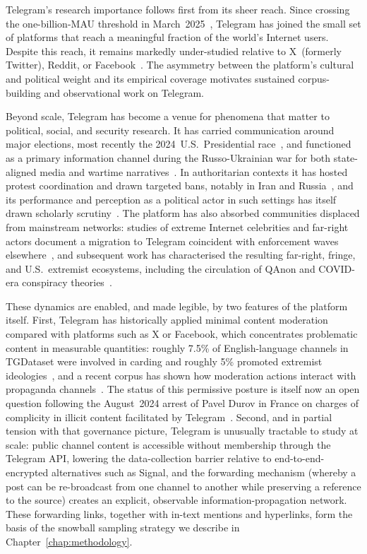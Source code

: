 Telegram's research importance follows first from its sheer reach.
Since crossing the one-billion-MAU threshold in March~2025~\cite{telegramstats2025}, Telegram has joined the small set of platforms that reach a meaningful fraction of the world's Internet users.
Despite this reach, it remains markedly under-studied relative to X~(formerly Twitter), Reddit, or Facebook~\cite{propaganda2025}.
The asymmetry between the platform's cultural and political weight and its empirical coverage motivates sustained corpus-building and observational work on Telegram.

Beyond scale, Telegram has become a venue for phenomena that matter to political, social, and security research.
It has carried communication around major elections, most recently the 2024~U.S.\ Presidential race~\cite{blas2025}, and functioned as a primary information channel during the Russo-Ukrainian war for both state-aligned media and wartime narratives~\cite{hanley2024,kloo2024}.
In authoritarian contexts it has hosted protest coordination and drawn targeted bans, notably in Iran and Russia~\cite{akbari2019}, and its performance and perception as a political actor in such settings has itself drawn scholarly scrutiny~\cite{wijermars2022}.
The platform has also absorbed communities displaced from mainstream networks: studies of extreme Internet celebrities and far-right actors document a migration to Telegram coincident with enforcement waves elsewhere~\cite{rogers2020,urman2022}, and subsequent work has characterised the resulting far-right, fringe, and U.S.\ extremist ecosystems, including the circulation of QAnon and COVID-era conspiracy theories~\cite{bovet2022,hoseini2024,walther2021}.

These dynamics are enabled, and made legible, by two features of the platform itself.
First, Telegram has historically applied minimal content moderation compared with platforms such as X or Facebook, which concentrates problematic content in measurable quantities: roughly 7.5\% of English-language channels in TGDataset were involved in carding and roughly 5\% promoted extremist ideologies~\cite{lamorgia2025}, and a recent corpus has shown how moderation actions interact with propaganda channels~\cite{propaganda2025}.
The status of this permissive posture is itself now an open question following the August~2024 arrest of Pavel Durov in France on charges of complicity in illicit content facilitated by Telegram~\cite{durov2024}.
Second, and in partial tension with that governance picture, Telegram is unusually tractable to study at scale: public channel content is accessible without membership through the Telegram API, lowering the data-collection barrier relative to end-to-end-encrypted alternatives such as Signal, and the forwarding mechanism (whereby a post can be re-broadcast from one channel to another while preserving a reference to the source) creates an explicit, observable information-propagation network.
These forwarding links, together with in-text mentions and hyperlinks, form the basis of the snowball sampling strategy we describe in Chapter~\ref{chap:methodology}.

